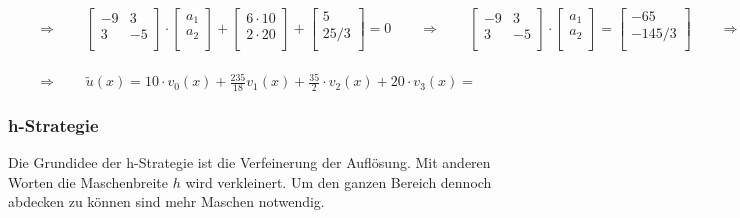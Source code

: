 $\qquad\Rightarrow\qquad
	\begin{bmatrix}
		-9 & 3  \\
		3  & -5 \\
	\end{bmatrix}\cdot
	\begin{bmatrix}
		a_1 \\
		a_2 \\
	\end{bmatrix}+
	\begin{bmatrix}
		6\cdot 10 \\
		2\cdot 20 \\
	\end{bmatrix}+
	\begin{bmatrix}
		5    \\
		25/3 \\
	\end{bmatrix}
	=0\qquad\Rightarrow\qquad
	\begin{bmatrix}
		-9 & 3  \\
		3  & -5 \\
	\end{bmatrix}\cdot
	\begin{bmatrix}
		a_1 \\
		a_2 \\
	\end{bmatrix}=
	\begin{bmatrix}
		-65    \\
		-145/3 \\
	\end{bmatrix}\qquad\Rightarrow\qquad
	\begin{bmatrix}
		a_1 \\
		a_2 \\
	\end{bmatrix}=
	\begin{bmatrix}
		235/18 \\
		35/2   \\
	\end{bmatrix}
$\\
\\
$
	\qquad\Rightarrow\qquad \tilde{u}(x)=10\cdot v_0(x)+\frac{235}{18} v_1(x)+\frac{35}{2}\cdot v_2(x)+20\cdot v_3(x)=
$




\subsubsection{h-Strategie}

Die Grundidee der h-Strategie ist die Verfeinerung der Auflösung. Mit anderen Worten die Maschenbreite $h$ wird verkleinert. Um den ganzen Bereich dennoch abdecken zu können sind mehr Maschen notwendig.

